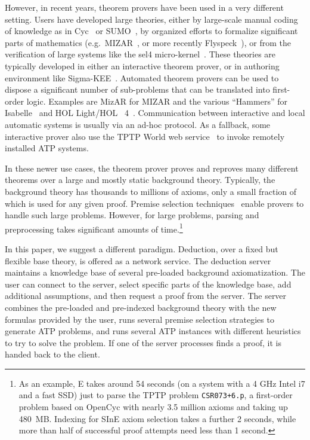 \documentclass{article}
\begin{document}
However, in recent years, theorem provers have been used in a very
different setting. Users have developed large theories, either by
large-scale manual coding of knowledge as in Cyc~\cite{RRG:CO-2005} or
SUMO~\cite{PNL:AAAIWS-2002}, by organized efforts to formalize
significant parts of mathematics (e.g.~MIZAR~\cite{TB:IJCAI-1985}, or
more recently Flyspeck~\cite{HHMNOZ:Kepler-2011}), or from the
verification of large systems like the sel4
micro-kernel~\cite{KE:SOSP-2009}. These theories are typically
developed in either an interactive theorem prover, or in authoring
environment like Sigma-KEE~\cite{PS:IJCAR-2014}. Automated theorem
provers can be used to dispose a significant number of sub-problems
that can be translated into first-order logic. Examples are MizAR for
MIZAR and the various ``Hammers'' for
Isabelle~\cite{MP:JAL-2007,MP:JAR-2009,BN:IJCAR-2010} and HOL
Light/HOL~ 4~\cite{KU:JAR-2014,GK:CPP-2015}. Communication between
interactive and local automatic systems is usually via an ad-hoc
protocol. As a fallback, some interactive prover also use the TPTP
World web service~\cite{Sutcliffe:LPAR-2010} to invoke remotely
installed ATP systems.

In these newer use cases, the theorem prover proves and reproves many
different theorems over a large and mostly static background
theory. Typically, the background theory has thousands to millions of
axioms, only a small fraction of which is used for any given
proof. Premise selection
techniques~\cite{HV:CADE-2011,KLTUH:CADE-2012,GK:CPP-2015} enable
provers to handle such large problems. However, for large problems,
parsing and preprocessing takes significant amounts of
time.\footnote{As an example, E takes around 54 seconds (on a system
  with a 4 GHz Intel i7 and a fast SSD) just to parse the TPTP problem
  \texttt{CSR073+6.p}, a first-order problem based on OpenCyc with
  nearly 3.5 million axioms and taking up 480~MB. Indexing for SInE
  axiom selection takes a further 2 seconds, while more than half of
  successful proof attempts need less than 1 second.}

In this paper, we suggest a different paradigm. Deduction, over a
fixed but flexible base theory, is offered as a network service. The
deduction server maintains a knowledge base of several pre-loaded
background axiomatization. The user can connect to the server, select
specific parts of the knowledge base, add additional assumptions, and
then request a proof from the server. The server combines the
pre-loaded and pre-indexed background theory with the new formulas
provided by the user, runs several premise selection strategies to
generate ATP problems, and runs several ATP instances with different
heuristics to try to solve the problem. If one of the server processes
finds a proof, it is handed back to the client.
\end{document}

